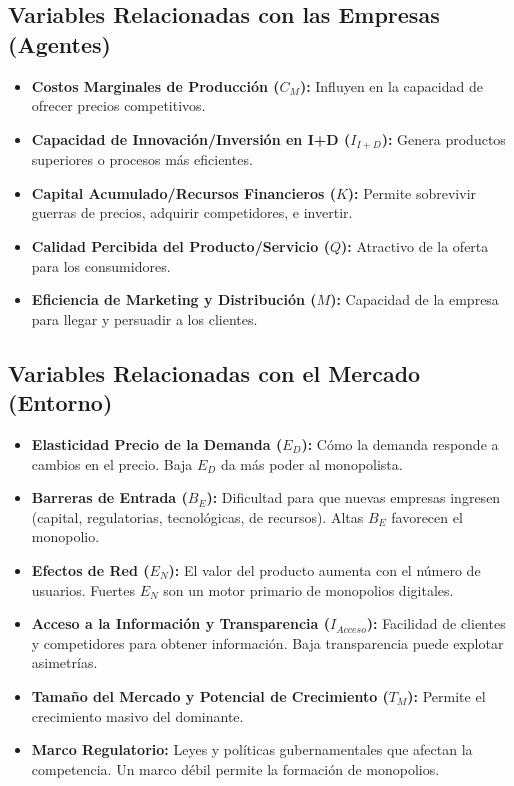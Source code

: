\documentclass{article}
\begin{document}
\subsection{Variables Relacionadas con las Empresas (Agentes)}
\begin{itemize}
    \item \textbf{Costos Marginales de Producción ($C_M$):} Influyen en la capacidad de ofrecer precios competitivos.
    \item \textbf{Capacidad de Innovación/Inversión en I+D ($I_{I+D}$):} Genera productos superiores o procesos más eficientes.
    \item \textbf{Capital Acumulado/Recursos Financieros ($K$):} Permite sobrevivir guerras de precios, adquirir competidores, e invertir.
    \item \textbf{Calidad Percibida del Producto/Servicio ($Q$):} Atractivo de la oferta para los consumidores.
    \item \textbf{Eficiencia de Marketing y Distribución ($M$):} Capacidad de la empresa para llegar y persuadir a los clientes.
\end{itemize}

\subsection{Variables Relacionadas con el Mercado (Entorno)}
\begin{itemize}
    \item \textbf{Elasticidad Precio de la Demanda ($E_D$):} Cómo la demanda responde a cambios en el precio. Baja $E_D$ da más poder al monopolista.
    \item \textbf{Barreras de Entrada ($B_E$):} Dificultad para que nuevas empresas ingresen (capital, regulatorias, tecnológicas, de recursos). Altas $B_E$ favorecen el monopolio.
    \item \textbf{Efectos de Red ($E_N$):} El valor del producto aumenta con el número de usuarios. Fuertes $E_N$ son un motor primario de monopolios digitales.
    \item \textbf{Acceso a la Información y Transparencia ($I_{Acceso}$):} Facilidad de clientes y competidores para obtener información. Baja transparencia puede explotar asimetrías.
    \item \textbf{Tamaño del Mercado y Potencial de Crecimiento ($T_M$):} Permite el crecimiento masivo del dominante.
    \item \textbf{Marco Regulatorio:} Leyes y políticas gubernamentales que afectan la competencia. Un marco débil permite la formación de monopolios.
\end{itemize}
\end{document}
